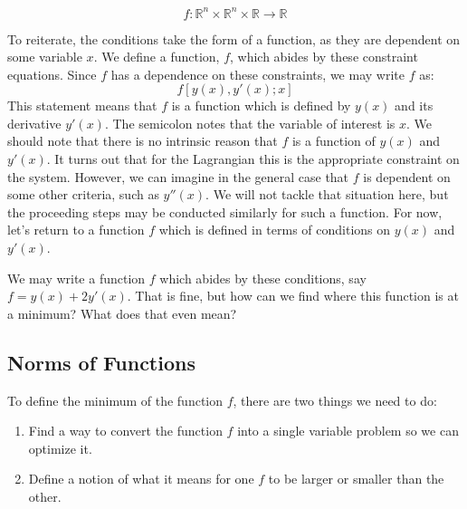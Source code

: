 \begin{equation}
f:\mathbb{R}^n\times \mathbb{R}^n\times \mathbb{R}\rightarrow\mathbb{R}
\end{equation}

To reiterate, the conditions take the form of a function, as they are dependent on some variable $x$. We define a function, $f$, which abides by these constraint equations. Since $f$ has a dependence on these constraints, we may write $f$ as:
$$f[y(x),y'(x);x]$$
This statement means that $f$ is a function which is defined by $y(x)$ and its derivative $y'(x)$. The semicolon notes that the variable of interest is $x$. We should note that there is no intrinsic reason that $f$ is a function of $y(x)$ and $y'(x)$. It turns out that for the \gls{Lagrangian} this is the appropriate constraint on the system. However, we can imagine in the general case that $f$ is dependent on some other criteria, such as $y''(x)$. We will not tackle that situation here, but the proceeding steps may be conducted similarly for such a function. For now, let's return to a function $f$ which is defined in terms of conditions on $y(x)$ and $y'(x)$.

We may write a function $f$ which abides by these conditions, say $f = y(x)+2y'(x)$. That is fine, but how can we find where this function is at a minimum? What does that even mean?

\subsection{Norms of Functions}

To define the minimum of the function $f$, there are two things we need to do:
\begin{enumerate}
    \item Find a way to convert the function $f$ into a single variable problem so we can optimize it.
    \item Define a notion of what it means for one $f$ to be larger or smaller than the other.
\end{enumerate}


